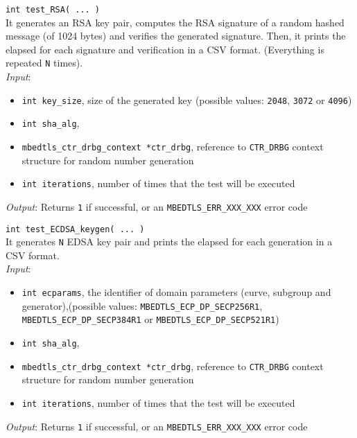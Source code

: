 \noindent
\texttt{int test\_RSA( ... )}\\
It generates an RSA key pair, computes the RSA signature of a random hashed message (of 1024 bytes) and verifies the generated signature. Then, it prints the elapsed for each signature and verification in a CSV format. (Everything is repeated \texttt{N} times). \\
\textit{Input}:
\begin{itemize}[noitemsep,nolistsep]
  \item \texttt{int key\_size}, size of the generated key (possible values: \texttt{2048}, \texttt{3072} or \texttt{4096})
  \item \texttt{int sha\_alg},
  \item \texttt{mbedtls\_ctr\_drbg\_context *ctr\_drbg}, reference to \texttt{CTR\_DRBG} context structure for random number generation
  \item \texttt{int iterations}, number of times that the test will be executed
\end{itemize}
\textit{Output}:  Returns \texttt{1} if successful, or an \texttt{MBEDTLS\_ERR\_XXX\_XXX} error code


\noindent
\texttt{int test\_ECDSA\_keygen( ... )}\\
It generates \texttt{N} EDSA key pair and prints the elapsed for each generation in a CSV format. \\
\textit{Input}:
\begin{itemize}[noitemsep,nolistsep]
  \item \texttt{int ecparams}, the identifier of domain parameters (curve, subgroup and generator),(possible values: \texttt{MBEDTLS\_ECP\_DP\_SECP256R1}, \texttt{MBEDTLS\_ECP\_DP\_SECP384R1} or \texttt{MBEDTLS\_ECP\_DP\_SECP521R1})
  \item \texttt{int sha\_alg},
  \item \texttt{mbedtls\_ctr\_drbg\_context *ctr\_drbg}, reference to \texttt{CTR\_DRBG} context structure for random number generation
  \item \texttt{int iterations}, number of times that the test will be executed
\end{itemize}
\textit{Output}:  Returns \texttt{1} if successful, or an \texttt{MBEDTLS\_ERR\_XXX\_XXX} error code


